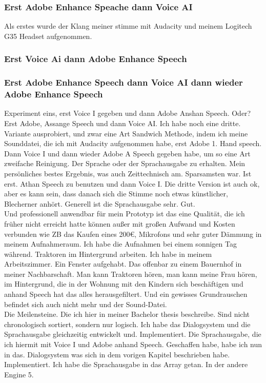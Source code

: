 \documentclass[10pt,a4paper,bibliography=totocnumbered,listof=totocnumbered]{scrartcl}
\begin{document}
\subsubsection{Erst Adobe Enhance Speache dann Voice AI}
Als erstes wurde der Klang meiner stimme mit Audacity und meinem Logitech G35 Headset aufgenommen.
\subsubsection{Erst Voice Ai dann Adobe Enhance Speech}
\subsubsection{Erst Adobe Enhance Speech dann Voice AI dann wieder Adobe Enhance Speech}
 
Experiment eins, erst Voice I gegeben und dann Adobe Anshan Speech.      	Oder? Erst Adobe, Assange Speech und dann Voice AI.  Ich habe noch eine dritte.
\\
Variante ausprobiert, und zwar eine Art Sandwich Methode, indem ich meine Sounddatei, die ich mit Audacity aufgenommen habe, erst Adobe 1. Hand speech. Dann Voice I und dann wieder Adobe A Speech gegeben habe, um so eine Art zweifache Reinigung. Der Sprache oder der Sprachausgabe zu erhalten. 	Mein persönliches bestes Ergebnis, was auch Zeittechnisch am. Sparsamsten war.  Ist erst.  Athan Speech zu benutzen und dann Voice I. Die dritte Version ist auch ok, aber es kann sein, dass danach sich die Stimme noch etwas künstlicher, Blecherner anhört.   Generell ist die Sprachausgabe sehr.  Gut.
\\
Und professionell anwendbar für mein Prototyp ist das eine Qualität, die ich früher nicht erreicht hatte können außer mit großen Aufwand und Kosten verbunden wie ZB das Kaufen eines 200€, Mikrofons und sehr guter Dämmung in meinem Aufnahmeraum. Ich habe die Aufnahmen bei einem sonnigen Tag während. Traktoren im Hintergrund arbeiten. Ich habe in meinem Arbeitszimmer. Ein Fenster aufgehabt. Das offenbar zu einem Bauernhof in meiner Nachbarschaft. Man kann Traktoren hören, man kann meine Frau hören, im Hintergrund, die in der Wohnung mit den Kindern sich beschäftigen und anhand Speech hat das alles herausgefiltert. Und ein gewisses Grundrauschen befindet sich auch nicht mehr und der Sound-Datei.
\\
Die Meilensteine.  Die ich hier in meiner Bachelor thesis beschreibe.  Sind nicht chronologisch sortiert, sondern nur logisch.  Ich habe das Dialogsystem und die Sprachausgabe gleichzeitig entwickelt und.  Implementiert.  Die Sprachausgabe, die ich hiermit mit Voice I und Adobe anhand Speech. Geschaffen habe, habe ich nun in das.  Dialogsystem was sich in dem vorigen Kapitel beschrieben habe. Implementiert. Ich habe die Sprachausgabe in das Array getan.     	In der andere Engine 5.
 
\end{document}

